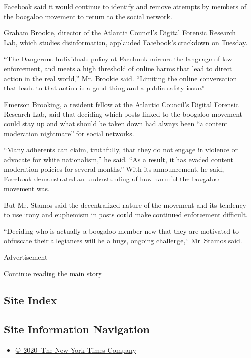 Facebook said it would continue to identify and remove attempts by
members of the boogaloo movement to return to the social network.

Graham Brookie, director of the Atlantic Council's Digital Forensic
Research Lab, which studies disinformation, applauded Facebook's
crackdown on Tuesday.

``The Dangerous Individuals policy at Facebook mirrors the language of
law enforcement, and meets a high threshold of online harms that lead to
direct action in the real world,'' Mr. Brookie said. ``Limiting the
online conversation that leads to that action is a good thing and a
public safety issue.''

Emerson Brooking, a resident fellow at the Atlantic Council's Digital
Forensic Research Lab, said that deciding which posts linked to the
boogaloo movement could stay up and what should be taken down had always
been ``a content moderation nightmare'' for social networks.

``Many adherents can claim, truthfully, that they do not engage in
violence or advocate for white nationalism,'' he said. ``As a result, it
has evaded content moderation policies for several months.'' With its
announcement, he said, Facebook demonstrated an understanding of how
harmful the boogaloo movement was.

But Mr. Stamos said the decentralized nature of the movement and its
tendency to use irony and euphemism in posts could make continued
enforcement difficult.

``Deciding who is actually a boogaloo member now that they are motivated
to obfuscate their allegiances will be a huge, ongoing challenge,'' Mr.
Stamos said.

Advertisement

\protect\hyperlink{after-bottom}{Continue reading the main story}

\hypertarget{site-index}{%
\subsection{Site Index}\label{site-index}}

\hypertarget{site-information-navigation}{%
\subsection{Site Information
Navigation}\label{site-information-navigation}}

\begin{itemize}
\tightlist
\item
  \href{https://help.nytimes3xbfgragh.onion/hc/en-us/articles/115014792127-Copyright-notice}{©~2020~The
  New York Times Company}
\end{itemize}


